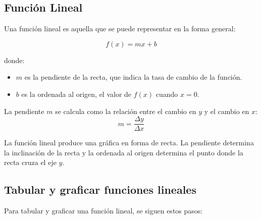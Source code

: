 \subsection{Función Lineal}

Una función lineal es aquella que se puede representar en la forma general:

\[
f(x) = mx + b
\]

donde:
\begin{itemize}
    \item \(m\) es la pendiente de la recta, que indica la tasa de cambio de la función.
    \item \(b\) es la ordenada al origen, el valor de \(f(x)\) cuando \(x = 0\).
\end{itemize}

La pendiente \(m\) se calcula como la relación entre el cambio en \(y\) y el cambio en \(x\):
\begin{equation}
    m = \frac{\Delta y}{\Delta x}
\end{equation}

La función lineal produce una gráfica en forma de recta. La pendiente determina la inclinación de la recta y la ordenada al origen determina el punto donde la recta cruza el eje \(y\).

\subsection{Tabular y graficar funciones lineales}

Para tabular y graficar una función lineal, se siguen estos pasos:

